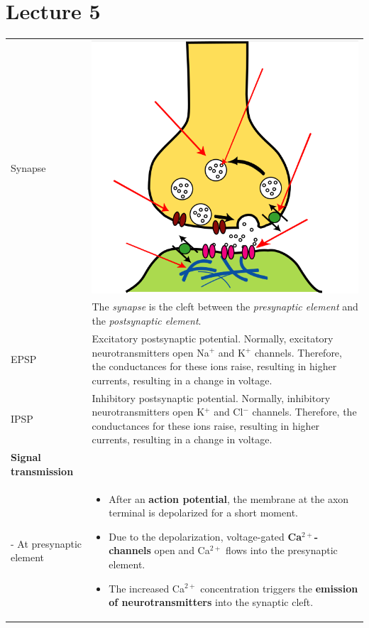\section{Lecture 5}
\begin{longtable}{p{4cm}p{15cm}}
Synapse		& \includegraphics[width = 10cm]{neuroinf_synapse2.png}\\
		& The \textit{synapse} is the cleft between the \textit{presynaptic element} and the \textit{postsynaptic element}.\\
EPSP		& Excitatory postsynaptic potential. Normally, excitatory neurotransmitters open Na$^+$ and K$^+$ channels. Therefore, the conductances for these ions raise, resulting in higher currents, resulting in a change in voltage.\\
IPSP		& Inhibitory postsynaptic potential. Normally, inhibitory neurotransmitters open K$^+$ and Cl$^-$ channels. Therefore, the conductances for these ions raise, resulting in higher currents, resulting in a change in voltage.\\
\textbf{Signal transmission}\\
- At presynaptic element	& \begin{itemize}
                        	  	\item After an \textbf{action potential}, the membrane at the axon terminal is depolarized for a short moment.
					\item Due to the depolarization, voltage-gated \textbf{Ca$^{2+}$-channels} open and Ca$^{2+}$ flows into the presynaptic element.
					\item The increased Ca$^{2+}$ concentration triggers the \textbf{emission of neurotransmitters} into the synaptic cleft.

\end{itemize}
\end{longtable}
